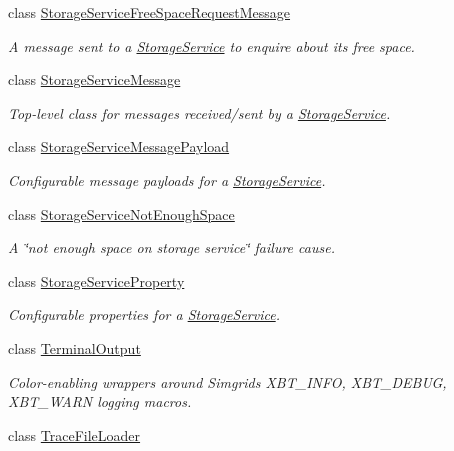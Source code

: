 \begin{DoxyCompactItemize}
class \hyperlink{classwrench_1_1_storage_service_free_space_request_message}{Storage\+Service\+Free\+Space\+Request\+Message}
\begin{DoxyCompactList}\small\item\em A message sent to a \hyperlink{classwrench_1_1_storage_service}{Storage\+Service} to enquire about its free space. \end{DoxyCompactList}\item 
class \hyperlink{classwrench_1_1_storage_service_message}{Storage\+Service\+Message}
\begin{DoxyCompactList}\small\item\em Top-\/level class for messages received/sent by a \hyperlink{classwrench_1_1_storage_service}{Storage\+Service}. \end{DoxyCompactList}\item 
class \hyperlink{classwrench_1_1_storage_service_message_payload}{Storage\+Service\+Message\+Payload}
\begin{DoxyCompactList}\small\item\em Configurable message payloads for a \hyperlink{classwrench_1_1_storage_service}{Storage\+Service}. \end{DoxyCompactList}\item 
class \hyperlink{classwrench_1_1_storage_service_not_enough_space}{Storage\+Service\+Not\+Enough\+Space}
\begin{DoxyCompactList}\small\item\em A \char`\"{}not enough space on storage service\char`\"{} failure cause. \end{DoxyCompactList}\item 
class \hyperlink{classwrench_1_1_storage_service_property}{Storage\+Service\+Property}
\begin{DoxyCompactList}\small\item\em Configurable properties for a \hyperlink{classwrench_1_1_storage_service}{Storage\+Service}. \end{DoxyCompactList}\item 
class \hyperlink{classwrench_1_1_terminal_output}{Terminal\+Output}
\begin{DoxyCompactList}\small\item\em Color-\/enabling wrappers around Simgrid\textquotesingle{}s X\+B\+T\+\_\+\+I\+N\+FO, X\+B\+T\+\_\+\+D\+E\+B\+UG, X\+B\+T\+\_\+\+W\+A\+RN logging macros. \end{DoxyCompactList}\item 
class \hyperlink{classwrench_1_1_trace_file_loader}{Trace\+File\+Loader}

\end{DoxyCompactItemize}
